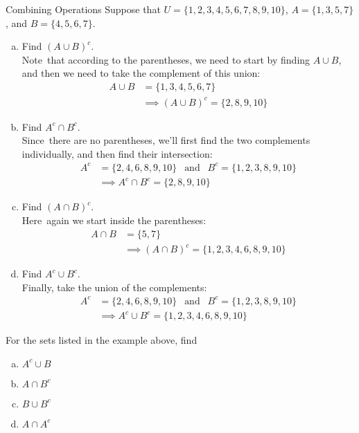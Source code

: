\begin{example}[https://www.youtube.com/watch?v=PCEPxKrRaQE]{Combining Operations}
Suppose that $U = \{1,2,3,4,5,6,7,8,9,10\}$, $A=\{1,3,5,7\}$, and $B=\{4,5,6,7\}$.

\begin{enumerate}[(a)]
\item Find $(A \cup B)^c$.\\

Note\sol\ that according to the parentheses, we need to start by finding $A \cup B$, and then we need to take the complement of this union:
\begin{align*}
A \cup B &= \{1,3,4,5,6,7\}\\
&\implies (A \cup B)^c = \{2,8,9,10\}
\end{align*}

\item Find $A^c \cap B^c$.\\

Since\sol\ there are no parentheses, we'll first find the two complements individually, and then find their intersection:
\begin{align*}
A^c &= \{2,4,6,8,9,10\} \ \ \textrm{ and } \ \ B^c = \{1,2,3,8,9,10\}\\
&\implies A^c \cap B^c = \{2,8,9,10\}
\end{align*}

\item Find $(A \cap B)^c$.\\

Here\sol\ again we start inside the parentheses:
\begin{align*}
A \cap B &= \{5,7\}\\
&\implies (A \cap B)^c = \{1,2,3,4,6,8,9,10\}
\end{align*}

\item Find $A^c \cup B^c$.\\

Finally\sol , take the union of the complements:
\begin{align*}
A^c &= \{2,4,6,8,9,10\} \ \ \textrm{ and } \ \ B^c = \{1,2,3,8,9,10\}\\
&\implies A^c \cup B^c = \{1,2,3,4,6,8,9,10\}
\end{align*}
\end{enumerate}
\end{example}

\begin{try}
For the sets listed in the example above, find
\begin{enumerate}[(a)]
\item $A^c \cup B$
\item $A \cap B^c$
\item $B \cup B^c$
\item $A \cap A^c$
\end{enumerate}
\end{try}
\vspace{0.5in}

